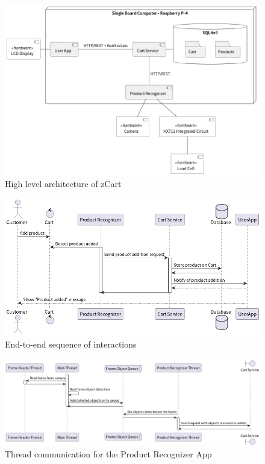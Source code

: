 \documentclass[openright]{normas-utf-tex} %
\begin{document}
\begin{figure}[H]
	\centering
	\includegraphics[width=1\textwidth]{./images/zCart.png}
	\caption[High level architecture of zCart]{High level architecture of zCart}
	\label{fig:dummy}
\end{figure}

\begin{figure}[H]
	\centering
	\includegraphics[width=1\textwidth]{./images/E2E.png}
	\caption[End-to-end sequence of interactions]{End-to-end sequence of interactions}
	\label{fig:dummy}
\end{figure}

\begin{figure}[H]
	\centering
	\includegraphics[width=1\textwidth]{./images/Product Recognizer Thread communication.png}
	\caption[Thread communication for the Product Recognizer App]{Thread communication for the Product Recognizer App}
	\label{fig:dummy}
\end{figure}
\end{document}
